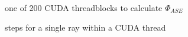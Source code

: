 \begin{figure}[H]
  \centerline
  {}
  \caption{one of 200 CUDA threadblocks to calculate $\Phi_{ASE}$}
  \label{graphic:kernel}
\end{figure}

\begin{figure}[H]
  \centerline
  {}
  \caption{steps for a single ray within a CUDA thread}
  \label{graphic:algorithm_steps}
\end{figure}


